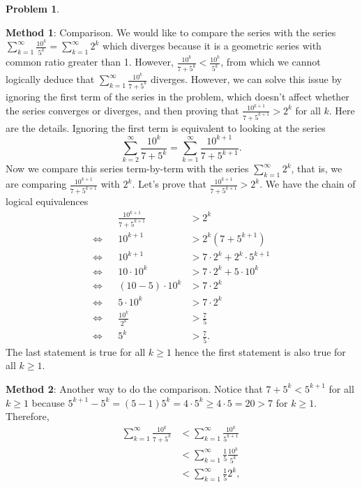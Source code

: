 \documentclass[11pt,oneside]{amsart}
\theoremstyle{definition}
\newtheorem{problem}{Problem}
\theoremstyle{plain}
\begin{document}
\begin{problem}
\begin{enumerate}[(a)]
\begin{solution}
          \textbf{Method 1}: Comparison. We would like to compare the series with the series $\sum_{k=1}^\infty \frac{10^k}{5^k}=\sum_{k=1}^\infty 2^k$ which diverges because it is a geometric series with common ratio greater than 1. However, $\frac{10^k}{7+5^k}<\frac{10^k}{5^k}$, from which we cannot logically deduce that $\sum_{k=1}^\infty\frac{10^k}{7+5^k}$ diverges. However, we can solve this issue by ignoring the first term of the series in the problem, which doesn't affect whether the series converges or diverges, and then proving that $\frac{10^{k+1}}{7+5^{k+1}}>2^k$ for all $k$. Here are the details. Ignoring the first term is equivalent to looking at the series
          \[\sum_{k=2}^\infty\frac{10^k}{7+5^k}=\sum_{k=1}^\infty\frac{10^{k+1}}{7+5^{k+1}}.\]
          Now we compare this series term-by-term with the series $\sum_{k=1}^\infty 2^k$, that is, we are comparing $\frac{10^{k+1}}{7+5^{k+1}}$ with $2^k$. Let's prove that $\frac{10^{k+1}}{7+5^{k+1}}>2^k$. We have the chain of logical equivalences
          \[\begin{alignedat}{3}
              && \frac{10^{k+1}}{7+5^{k+1}}&>2^k\\
              \iff&& 10^{k+1} &>2^k(7+5^{k+1})\\
              \iff&& 10^{k+1} &> 7\cdot 2^k+2^k\cdot 5^{k+1}\\
              \iff&& 10\cdot 10^k &> 7\cdot 2^k+5\cdot 10^k\\
              \iff&& (10-5)\cdot 10^k &> 7\cdot 2^k\\
              \iff&& 5\cdot 10^k &> 7\cdot 2^k\\
              \iff&& \frac{10^k}{2^k} &>\frac 75\\
              \iff&& 5^k &>\frac 75.
            \end{alignedat}\]
          The last statement is true for all $k\geq 1$ hence the first statement is also true for all $k\geq 1$.
        \end{solution}
        \begin{solution}
          \textbf{Method 2}: Another way to do the comparison. Notice that $7+5^k<5^{k+1}$ for all $k\geq 1$ because $5^{k+1}-5^k=(5-1)5^k=4\cdot 5^k\geq 4\cdot 5=20>7$ for $k\geq 1$. Therefore,
          \[\begin{split}
              \sum_{k=1}^\infty\frac{10^k}{7+5^k} &<\sum_{k=1}^\infty\frac{10^k}{5^{k+1}}\\
              &<\sum_{k=1}^\infty\frac 15\frac{10^k}{5^k}\\
              &<\sum_{k=1}^\infty\frac 15 2^k,

\end{split}\]
\end{solution}
\end{enumerate}
\end{problem}
\end{document}
